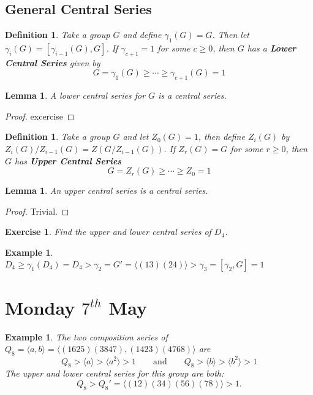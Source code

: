 \documentclass[a4paper,10pt]{article}
\newtheorem{Def}[thm]{Definition}
\newtheorem{eg}[thm]{Example}
\newtheorem{Ex}[thm]{Exercise}
\newtheorem{Lem}[thm]{Lemma}
\begin{document}
\subsection{General Central Series}

\begin{Def}
Take a group $G$ and define $\gamma_1 (G) = G$. Then let $\gamma_i (G) = [\gamma_{i-1} (G), G]$. If $\gamma_{c+1} = 1$ for some $c \geq 0$, then $G$ has a \textbf{Lower Central Series} given by
\[ G = \gamma_1(G) \geq \cdots \geq \gamma_{c+1}(G) = 1 \]
\end{Def}

\begin{Lem}
A lower central series for $G$ is a central series.
\end{Lem}

\begin{proof}
excercise
\end{proof}

\begin{Def}
Take a group $G$ and let $Z_0(G) = 1$, then define $Z_i(G)$ by $Z_i(G) / Z_{i-1}(G) = Z( G / Z_{i-1}(G) )$. If $Z_r(G) = G$ for some $r \geq 0$, then $G$ has \textbf{Upper Central Series} 
\[ G = Z_r(G) \geq \cdots \geq Z_0 = 1 \]
\end{Def}

\begin{Lem}
An upper central series is a central series.
\end{Lem}

\begin{proof}
Trivial.
\end{proof}


\begin{Ex}
Find the upper and lower central series of $D_4$. 
\end{Ex}

\begin{eg}
$D_4 \geq \gamma_1(D_4) = D_4 > \gamma_2 = G' = \langle (13)(24) \rangle > \gamma_3 = [\gamma_2 , G] = 1$
\end{eg}





\newpage
\section{Monday $7^{th}$ May}

\begin{eg}
The two composition series of $Q_8 = \langle a, b\rangle = \langle (1625)(3847), (1423)(4768) \rangle$ are
\[ Q_8 > \langle a \rangle > \langle a^2 \rangle > 1 \qquad \text{and} \qquad Q_8 > \langle b \rangle > \langle b^2 \rangle > 1 \]
The upper and lower central series for this group are both:
\[ Q_8 > Q_8' = \langle (12)(34)(56)(78) \rangle > 1. \]
\end{eg}
\end{document}
